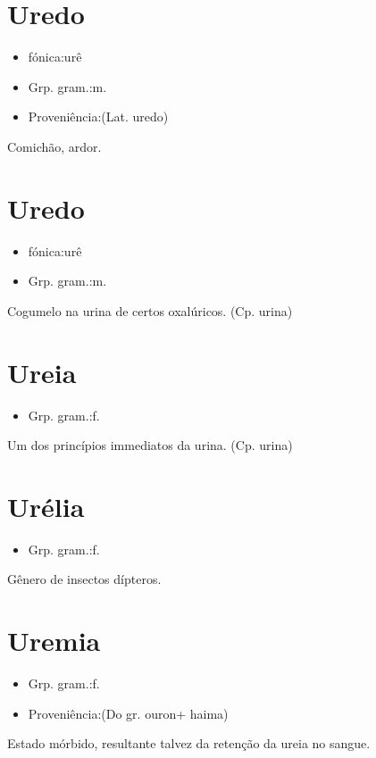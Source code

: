 \documentclass{article}
\begin{document}
\section{Uredo}
\begin{itemize}
\item {fónica:urê}
\end{itemize}
\begin{itemize}
\item {Grp. gram.:m.}
\end{itemize}
\begin{itemize}
\item {Proveniência:(Lat. \textunderscore uredo\textunderscore )}
\end{itemize}
Comichão, ardor.
\section{Uredo}
\begin{itemize}
\item {fónica:urê}
\end{itemize}
\begin{itemize}
\item {Grp. gram.:m.}
\end{itemize}
Cogumelo na urina de certos oxalúricos.
(Cp. \textunderscore urina\textunderscore )
\section{Ureia}
\begin{itemize}
\item {Grp. gram.:f.}
\end{itemize}
Um dos princípios immediatos da urina.
(Cp. \textunderscore urina\textunderscore )
\section{Urélia}
\begin{itemize}
\item {Grp. gram.:f.}
\end{itemize}
Gênero de insectos dípteros.
\section{Uremia}
\begin{itemize}
\item {Grp. gram.:f.}
\end{itemize}
\begin{itemize}
\item {Proveniência:(Do gr. \textunderscore ouron\textunderscore  + \textunderscore haima\textunderscore )}
\end{itemize}
Estado mórbido, resultante talvez da retenção da ureia no sangue.
\end{document}

